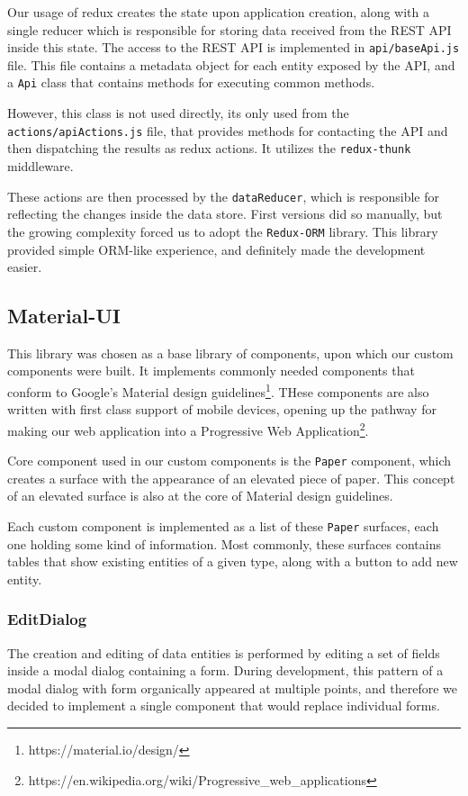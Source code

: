 Our usage of redux creates the state upon application creation, along with a single reducer which is responsible
for storing data received from the REST API inside this state. The access to the REST API is implemented in
\verb|api/baseApi.js| file. This file contains a metadata object for each entity exposed by the API, and
a \verb|Api| class that contains methods for executing common methods.

However, this class is not used directly, its only used from the \verb|actions/apiActions.js| file, that
provides methods for contacting the API and then dispatching the results as redux actions. It utilizes
the \verb|redux-thunk| middleware.

These actions are then processed by the \verb|dataReducer|, which is responsible for reflecting the changes inside the
data store. First versions did so manually, but the growing complexity forced us to adopt the \verb|Redux-ORM| library.
This library provided simple ORM-like experience, and definitely made the development easier.

\subsection{Material-UI}
This library was chosen as a base library of components, upon which our custom components were built.
It implements commonly needed components that conform to Google's Material design guidelines\footnote{https://material.io/design/}.
THese components are also written with first class support of mobile devices, opening up the pathway for
making our web application into a Progressive Web Application\footnote{https://en.wikipedia.org/wiki/Progressive\_web\_applications}.

Core component used in our custom components is the \verb|Paper| component, which creates a surface
with the appearance of an elevated piece of paper. This concept of an elevated surface is also at the core of
Material design guidelines.

Each custom component is implemented as a list of these \verb|Paper| surfaces, each one holding some kind of information.
Most commonly, these surfaces contains tables that show existing entities of a given type, along with a button to add new entity.

\subsubsection{EditDialog}
The creation and editing of data entities is performed by editing a set of fields inside a modal dialog containing a
form. During development, this pattern of a modal dialog with form organically appeared at multiple points, and therefore we decided to implement a
single component that would replace individual forms.

